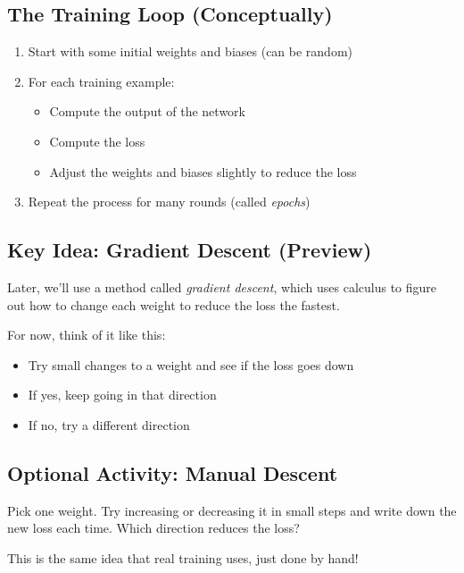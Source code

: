 \documentclass{book}
\begin{document}
\subsection*{The Training Loop (Conceptually)}

\begin{enumerate}
  \item Start with some initial weights and biases (can be random)
  \item For each training example:
    \begin{itemize}
      \item Compute the output of the network
      \item Compute the loss
      \item Adjust the weights and biases slightly to reduce the loss
    \end{itemize}
  \item Repeat the process for many rounds (called \textit{epochs})
\end{enumerate}

\subsection*{Key Idea: Gradient Descent (Preview)}

Later, we’ll use a method called \textit{gradient descent}, which uses calculus to figure out how to change each weight to reduce the loss the fastest.

For now, think of it like this:

\begin{itemize}
  \item Try small changes to a weight and see if the loss goes down
  \item If yes, keep going in that direction
  \item If no, try a different direction
\end{itemize}

\subsection*{Optional Activity: Manual Descent}

Pick one weight. Try increasing or decreasing it in small steps and write down the new loss each time. Which direction reduces the loss?

This is the same idea that real training uses, just done by hand!

\bigskip
\end{document}
